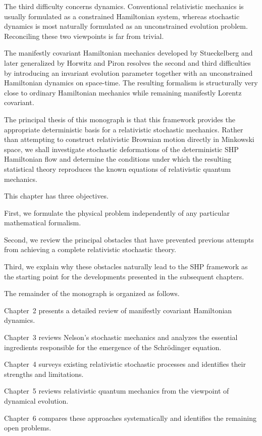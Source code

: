 The third difficulty concerns dynamics. Conventional relativistic
mechanics is usually formulated as a constrained Hamiltonian system,
whereas stochastic dynamics is most naturally formulated as an
unconstrained evolution problem. Reconciling these two viewpoints is far
from trivial.

The manifestly covariant Hamiltonian mechanics developed by
Stueckelberg and later generalized by Horwitz and Piron resolves the
second and third difficulties by introducing an invariant evolution
parameter together with an unconstrained Hamiltonian dynamics on
space-time. The resulting formalism is structurally very close to
ordinary Hamiltonian mechanics while remaining manifestly Lorentz
covariant.

The principal thesis of this monograph is that this framework provides
the appropriate deterministic basis for a relativistic stochastic
mechanics. Rather than attempting to construct relativistic Brownian
motion directly in Minkowski space, we shall investigate stochastic
deformations of the deterministic SHP Hamiltonian flow and determine the
conditions under which the resulting statistical theory reproduces the
known equations of relativistic quantum mechanics.

This chapter has three objectives.

First, we formulate the physical problem independently of any
particular mathematical formalism.

Second, we review the principal obstacles that have prevented previous
attempts from achieving a complete relativistic stochastic theory.

Third, we explain why these obstacles naturally lead to the SHP
framework as the starting point for the developments presented in the
subsequent chapters.

The remainder of the monograph is organized as follows.

Chapter~2 presents a detailed review of manifestly covariant
Hamiltonian dynamics.

Chapter~3 reviews Nelson's stochastic mechanics and analyzes the
essential ingredients responsible for the emergence of the Schrödinger
equation.

Chapter~4 surveys existing relativistic stochastic processes and
identifies their strengths and limitations.

Chapter~5 reviews relativistic quantum mechanics from the viewpoint of
dynamical evolution.

Chapter~6 compares these approaches systematically and identifies the
remaining open problems.

